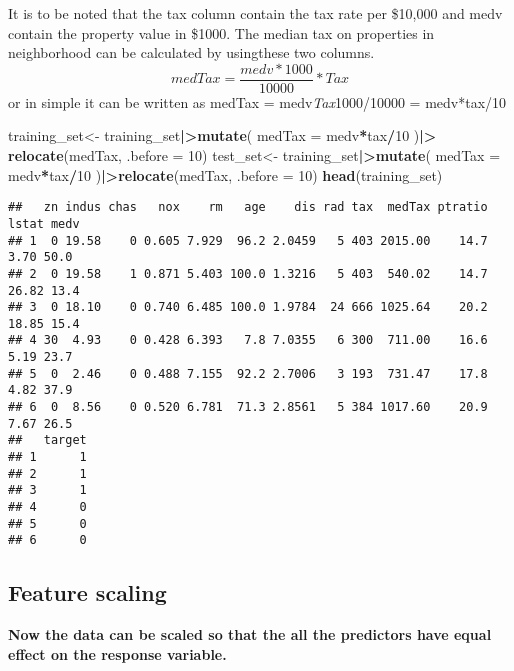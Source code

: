 \documentclass[
]{article}
\newenvironment{Shaded}{\begin{snugshade}}{\end{snugshade}}
\newcommand{\AttributeTok}[1]{\textcolor[rgb]{0.13,0.29,0.53}{#1}}
\newcommand{\DecValTok}[1]{\textcolor[rgb]{0.00,0.00,0.81}{#1}}
\newcommand{\FunctionTok}[1]{\textcolor[rgb]{0.13,0.29,0.53}{\textbf{#1}}}
\newcommand{\NormalTok}[1]{#1}
\newcommand{\OtherTok}[1]{\textcolor[rgb]{0.56,0.35,0.01}{#1}}
\newcommand{\SpecialCharTok}[1]{\textcolor[rgb]{0.81,0.36,0.00}{\textbf{#1}}}
\begin{document}
It is to be noted that the tax column contain the tax rate per \$10,000
and medv contain the property value in \$1000. The median tax on
properties in neighborhood can be calculated by usingthese two columns.
\[medTax = \frac{medv*1000}{10000}*Tax\] or in simple it can be written
as medTax = medv\emph{Tax}1000/10000 = medv*tax/10

\begin{Shaded}
\begin{Highlighting}[]
\NormalTok{training\_set}\OtherTok{\textless{}{-}}\NormalTok{ training\_set}\SpecialCharTok{|\textgreater{}}\FunctionTok{mutate}\NormalTok{(}
  \AttributeTok{medTax =}\NormalTok{ medv}\SpecialCharTok{*}\NormalTok{tax}\SpecialCharTok{/}\DecValTok{10}
\NormalTok{)}\SpecialCharTok{|\textgreater{}}
  \FunctionTok{relocate}\NormalTok{(medTax, }\AttributeTok{.before =} \DecValTok{10}\NormalTok{)}
\NormalTok{test\_set}\OtherTok{\textless{}{-}}\NormalTok{ training\_set}\SpecialCharTok{|\textgreater{}}\FunctionTok{mutate}\NormalTok{(}
  \AttributeTok{medTax =}\NormalTok{ medv}\SpecialCharTok{*}\NormalTok{tax}\SpecialCharTok{/}\DecValTok{10}
\NormalTok{)}\SpecialCharTok{|\textgreater{}}\FunctionTok{relocate}\NormalTok{(medTax, }\AttributeTok{.before =} \DecValTok{10}\NormalTok{)}
\FunctionTok{head}\NormalTok{(training\_set)}
\end{Highlighting}
\end{Shaded}

\begin{verbatim}
##   zn indus chas   nox    rm   age    dis rad tax  medTax ptratio lstat medv
## 1  0 19.58    0 0.605 7.929  96.2 2.0459   5 403 2015.00    14.7  3.70 50.0
## 2  0 19.58    1 0.871 5.403 100.0 1.3216   5 403  540.02    14.7 26.82 13.4
## 3  0 18.10    0 0.740 6.485 100.0 1.9784  24 666 1025.64    20.2 18.85 15.4
## 4 30  4.93    0 0.428 6.393   7.8 7.0355   6 300  711.00    16.6  5.19 23.7
## 5  0  2.46    0 0.488 7.155  92.2 2.7006   3 193  731.47    17.8  4.82 37.9
## 6  0  8.56    0 0.520 6.781  71.3 2.8561   5 384 1017.60    20.9  7.67 26.5
##   target
## 1      1
## 2      1
## 3      1
## 4      0
## 5      0
## 6      0
\end{verbatim}

\hypertarget{feature-scaling}{%
\subsection{Feature scaling}\label{feature-scaling}}

\textbf{Now the data can be scaled so that the all the predictors have
equal effect on the response variable.}
\end{document}
